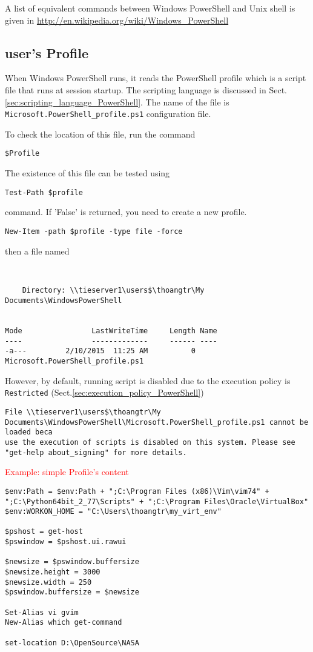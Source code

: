 A list of equivalent commands between Windows PowerShell and Unix shell is given in 
\url{http://en.wikipedia.org/wiki/Windows_PowerShell}


\subsection{user's Profile}
\label{sec:profile_PowerShell}

When Windows PowerShell runs, it reads the PowerShell profile which is a script
file that runs at session startup. The scripting language is discussed in
Sect.\ref{sec:scripting_language_PowerShell}.
The name of the file is \verb!Microsoft.PowerShell_profile.ps1! configuration
file.

To check the location of this file, run the command
\begin{verbatim}
$Profile
\end{verbatim}

The existence of this file can be tested using
\begin{verbatim}
Test-Path $profile
\end{verbatim}
command. If 'False' is returned, you need to create a new profile.
\begin{verbatim}
New-Item -path $profile -type file -force
\end{verbatim}
then a file named 
\begin{verbatim}


    Directory: \\tieserver1\users$\thoangtr\My Documents\WindowsPowerShell


Mode                LastWriteTime     Length Name
----                -------------     ------ ----
-a---         2/10/2015  11:25 AM          0 Microsoft.PowerShell_profile.ps1
\end{verbatim}

However, by default, running script is
disabled due to the execution policy is \verb!Restricted! (Sect.\ref{sec:execution_policy_PowerShell})
\begin{verbatim}
File \\tieserver1\users$\thoangtr\My Documents\WindowsPowerShell\Microsoft.PowerShell_profile.ps1 cannot be loaded beca
use the execution of scripts is disabled on this system. Please see "get-help about_signing" for more details.
\end{verbatim}

\textcolor{red}{Example: simple Profile's content}
\begin{verbatim}
$env:Path = $env:Path + ";C:\Program Files (x86)\Vim\vim74" + ";C:\Python64bit_2_77\Scripts" + ";C:\Program Files\Oracle\VirtualBox"
$env:WORKON_HOME = "C:\Users\thoangtr\my_virt_env"

$pshost = get-host
$pswindow = $pshost.ui.rawui

$newsize = $pswindow.buffersize
$newsize.height = 3000
$newsize.width = 250
$pswindow.buffersize = $newsize

Set-Alias vi gvim
New-Alias which get-command

set-location D:\OpenSource\NASA
\end{verbatim}


